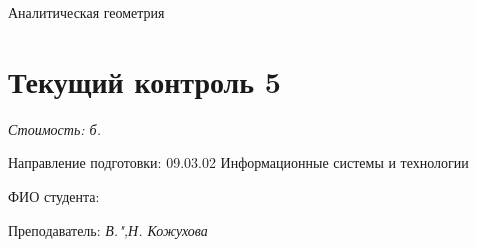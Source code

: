\documentclass[a4paper, 12pt]{article}
\begin{document}
\thispagestyle{empty}

\vspace{-10ex}
	
\begin{center}
\Huge{Аналитическая геометрия}\\
\vspace{-3ex}
\section*{Текущий контроль 5}
\end{center}
\vspace{-2ex}	
\textit{Стоимость: \pointssum* б.}
\begin{flushleft}
Направление подготовки:  09.03.02 Информационные системы и технологии %

ФИО студента: %
 

Преподаватель: \textit{В.",Н. Кожухова}	
\end{flushleft}	
\end{document}
